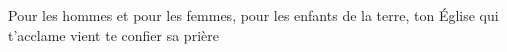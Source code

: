 Pour les hommes et pour les femmes, pour les enfants de la terre, ton Église qui t’acclame vient te confier sa prière 
